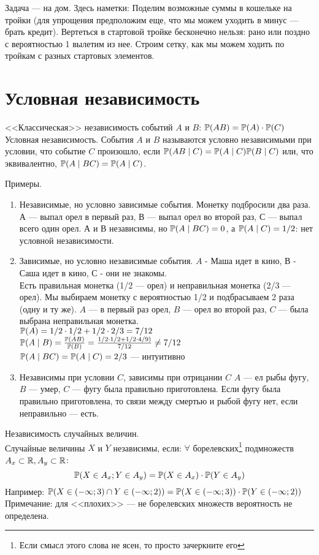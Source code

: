 Задача --- на дом. Здесь наметки:
Поделим возможные суммы в кошельке на тройки (для упрощения предположим еще, что мы можем уходить в минус --- брать кредит). Вертеться в стартовой тройке бесконечно нельзя: рано или поздно с вероятностью 1 вылетим из нее. Строим сетку, как мы можем ходить по тройкам с разных стартовых элементов. 

\section{Условная независимость}

<<Классическая>> независимость событий $A$ и $B$: $\P(AB)=\P(A)\cdot\P(C)$
Условная независимость. События $A$ и $B$ называются условно независимыми при условии, что событие $C$ произошло, если $\P(AB \mid C)=\P(A \mid C)\P(B \mid C)$ или, что эквивалентно, $\P(A\mid BC)=\P(A\mid C)$. 

Примеры.
\begin{enumerate}
\item Независимые, но условно зависимые события.
Монетку подбросили два раза. $А$ --- выпал орел в первый раз, $В$ --- выпал орел во второй раз, $С$ --- выпал всего один орел. $А$ и $В$ независимы, но $\P(A\mid BC)=0$, а $\P(A\mid C)=1/2$: нет условной независимости.
\item Зависимые, но условно независимые события.
$A$ - Маша идет в кино, $В$ - Саша идет в кино, $С$ - они не знакомы.\\

Есть правильная монетка (1/2 --- орел) и неправильная монетка (2/3 --- орел). Мы выбираем монетку с вероятностью 1/2 и подбрасываем 2 раза (одну и ту же). $A$ --- в первый раз орел, $B$ --- орел во второй раз, $C$ --- была выбрана неправильная монетка.\\
$\P(A)=1/2\cdot1/2+1/2\cdot2/3=7/12$\\
$\P(A\mid B)=\frac{\P(AB)}{\P(B)}=\frac{1/2\cdot1/2+1/2\cdot4/9)}{7/12} \not = 7/12$\\
$\P(A\mid BC)=\P(A\mid C)=2/3$ --- интуитивно
\item Независимы при условии $C$, зависимы при отрицании $C$
$A$ --- ел рыбы фугу, $B$ --- умер, $C$ --- фугу была правильно приготовлена.
Если фугу была правильно приготовлена, то связи между смертью и рыбой фугу нет, если неправильно --- есть.
\end{enumerate}

Независимость случайных величин.\\
Случайные величины $X$ и $Y$ независимы, если:
$\forall$ борелевских\footnote{Если смысл этого слова не ясен, то просто зачеркните его}  подмножеств $A_x\subset\R, A_y\subset\R$:
 \begin{equation}
\P(X\in A_x;Y\in A_y)=\P(X\in A_x)\cdot \P(Y\in A_y)
\end{equation}
Например: $\P(X\in(-\infty;3)\cap Y\in (-\infty; 2))=\P(X \in (-\infty;3))\cdot \P(Y \in (-\infty;2))$
Примечание: для <<плохих>> --- не борелевских множеств вероятность не определена. 

